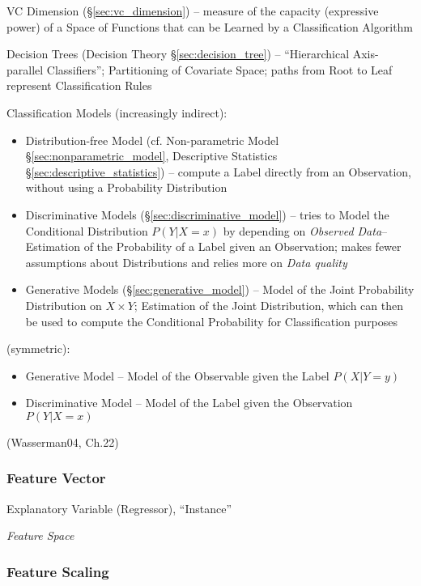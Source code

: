 \fist VC Dimension (\S\ref{sec:vc_dimension}) -- measure of the capacity
(expressive power) of a Space of Functions that can be Learned by a
Classification Algorithm

\fist Decision Trees (Decision Theory \S\ref{sec:decision_tree}) --
``Hierarchical Axis-parallel Classifiers''; Partitioning of Covariate Space;
paths from Root to Leaf represent Classification Rules

Classification Models (increasingly indirect):
\begin{itemize}
  \item Distribution-free Model (cf. Non-parametric Model
    \S\ref{sec:nonparametric_model}, Descriptive Statistics
    \S\ref{sec:descriptive_statistics}) -- compute a Label directly from an
    Observation, without using a Probability Distribution
  \item Discriminative Models (\S\ref{sec:discriminative_model}) -- tries to
    Model the Conditional Distribution $P(Y|X = x)$ by depending on
    \emph{Observed Data}-- Estimation of the Probability of a Label given an
    Observation; makes fewer assumptions about Distributions and relies
    more on \emph{Data quality}
  \item Generative Models (\S\ref{sec:generative_model}) -- Model of the
    Joint Probability Distribution on $X \times Y$; Estimation of the Joint
    Distribution, which can then be used to compute the Conditional Probability
    for Classification purposes
\end{itemize}

(symmetric):
\begin{itemize}
  \item Generative Model -- Model of the Observable given the Label $P(X|Y = y)$
  \item Discriminative Model -- Model of the Label given the Observation
    $P(Y|X = x)$
\end{itemize}

(Wasserman04, Ch.22)



\subsubsection{Feature Vector}\label{sec:feature_vector}

Explanatory Variable (Regressor), ``Instance''

\emph{Feature Space}



\subsubsection{Feature Scaling}\label{sec:feature_scaling}

